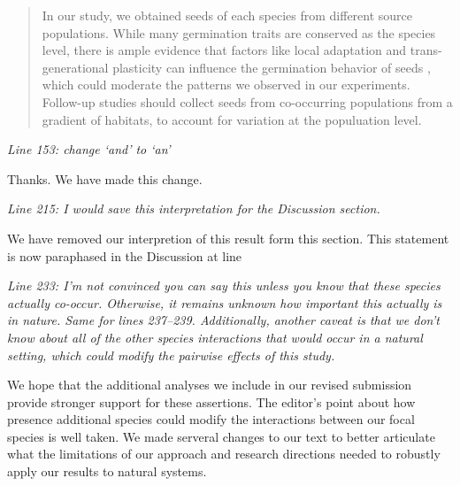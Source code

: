 \documentclass[11pt]{article}
\begin{document}
\begin{quote}In our study, we obtained seeds of each species from different source populations. While many germination traits are conserved as the species level, there is ample evidence that factors like local adaptation and trans-generational plasticity can influence the germination behavior of seeds \citep{}, which could moderate the patterns we observed in our experiments. Follow-up studies should collect seeds from co-occurring populations from a gradient of habitats, to account for variation at the populuation level.\end{quote}

\emph{Line 153: change ‘and’ to ‘an’}

Thanks. We have made this change.

\emph{Line 215: I would save this interpretation for the Discussion section.}

We have removed our interpretion of this result form this section. This statement is now paraphased in the Discussion at line 

\emph{Line 233:  I’m not convinced you can say this unless you know that these species actually co-occur. Otherwise, it remains unknown how important this actually is in nature. Same for lines 237–239. Additionally, another caveat is that we don’t know about all of the other species interactions that would occur in a natural setting, which could modify the pairwise effects of this study.}

We hope that the additional analyses we include in our revised submission provide stronger support for these assertions. The editor's point about how presence additional species could modify the interactions between our focal species is well taken. We made serveral changes to our text to better articulate what the limitations of our approach and research directions needed to robustly apply our results to natural systems.
\end{document}
